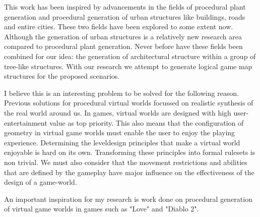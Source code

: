 This work has been inspired by advancements in the fields of procedural plant generation and procedural generation of urban structures like buildings, roads and entire cities. These two fields have been explored to some extent now. Although the generation of urban structures is a relatively new research area compared to procedural plant generation. Never before have these fields been combined for our idea: the generation of architectural structure within a group of tree-like structures. With our research we attempt to 
generate logical game map structures for the proposed scenarios.

I believe this is an interesting problem to be solved for the following reason. Previous solutions for procedural virtual worlds focussed on realistic synthesis of the real world around us. In games, virtual worlds are designed with high user-entertainment value as top priority. This also means that the configuration of geometry in virtual game worlds must enable the user to enjoy the playing experience. Determining the leveldesign principles that make a virtual world enjoyable is hard on its own. Transforming these principles into formal rulesets is non trivial. We must also consider that the movement restrictions and abilities that are defined by the gameplay have major influence on the effectiveness of the design of a game-world. 


An important inspiration for my research is work done on procedural generation of virtual game worlds in games such as "Love" and "Diablo 2". 

